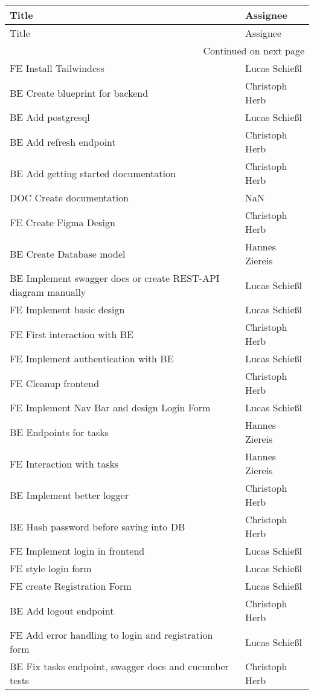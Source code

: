 \begin{longtable}{ll}
\label{GitLab Issues} \\
\toprule
Title & Assignee \\
\midrule
\endfirsthead
\toprule
Title & Assignee \\
\midrule
\endhead
\midrule
\multicolumn{2}{r}{Continued on next page} \\
\midrule
\endfoot
\bottomrule
\endlastfoot
FE Install Tailwindcss & Lucas Schießl \\
BE Create blueprint for backend & Christoph Herb \\
BE Add postgresql & Lucas Schießl \\
BE Add refresh endpoint & Christoph Herb \\
BE Add getting started documentation & Christoph Herb \\
DOC Create documentation & NaN \\
FE Create Figma Design & Christoph Herb \\
BE Create Database model & Hannes Ziereis \\
BE Implement swagger docs or create REST-API diagram manually & Lucas Schießl \\
FE Implement basic design & Lucas Schießl \\
FE First interaction with BE & Christoph Herb \\
FE Implement authentication with BE & Lucas Schießl \\
FE Cleanup frontend & Christoph Herb \\
FE Implement Nav Bar and design Login Form & Lucas Schießl \\
BE Endpoints for tasks & Hannes Ziereis \\
FE Interaction with tasks & Hannes Ziereis \\
BE Implement better logger & Christoph Herb \\
BE Hash password before saving into DB & Christoph Herb \\
FE Implement login in frontend & Lucas Schießl \\
FE style login form & Lucas Schießl \\
FE create Registration Form & Lucas Schießl \\
BE Add logout endpoint & Christoph Herb \\
FE Add error handling to login and registration form & Lucas Schießl \\
BE Fix tasks endpoint, swagger docs and cucumber tests & Christoph Herb \\

\end{longtable}
